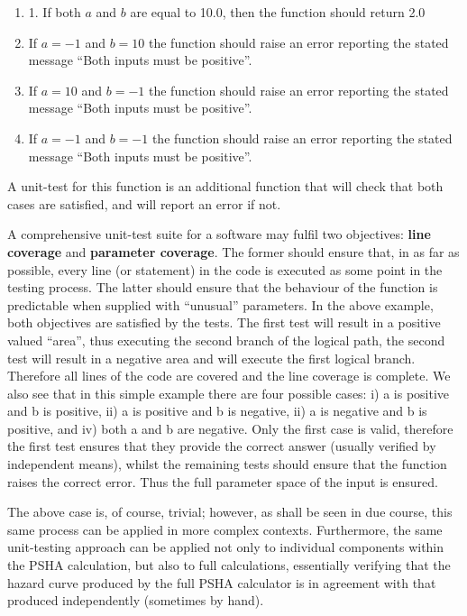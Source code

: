 \begin{enumerate}
\item 1. If both $a$ and $b$ are equal to 10.0, then the function 
    should return 2.0
\item If $a = -1$ and $b = 10$ the function should raise an error 
    reporting the stated message ``Both inputs must be positive''.
\item If $a = 10$ and $b = -1$ the function should raise an error 
    reporting the stated message ``Both inputs must be positive''.
\item If $a = -1$ and $b = -1$ the function should raise an error 
    reporting the stated message ``Both inputs must be positive''.
\end{enumerate}

A unit-test for this function is an additional function that will 
check that both cases are satisfied, and will report an error if not. 

A comprehensive unit-test suite for a software may fulfil two objectives: 
\textbf{line coverage} and \textbf{parameter coverage}. The former should 
ensure that, in as far as possible, every line (or statement) in the code 
is executed as some point in the testing process. The latter should ensure
that the behaviour of the function is predictable when supplied with 
``unusual'' parameters. In the above example, both objectives are satisfied
by the tests. The first test will result in a positive valued ``area'',
thus executing the second branch of the logical path, the second test will
result in a negative area and will execute the first logical branch. 
%
Therefore all lines of the code are covered and the line coverage is 
complete. We also see that in this simple example there are four possible
cases: i) a is positive and b is positive, ii) a is positive and b is 
negative,  ii) a is negative and b is positive, and iv) both a and b 
are negative. Only the first case is valid, therefore the first test 
ensures that they provide the correct answer (usually verified by 
independent means), whilst the remaining tests should ensure that 
the function raises the correct error. Thus the full parameter space 
of the input is ensured.

The above case is, of course, trivial; however, as shall be seen in due
course, this same process can be applied in more complex contexts. 
%
Furthermore, the same unit-testing approach can be applied not only 
to individual components within the PSHA calculation, but also to 
full calculations, essentially verifying that the hazard curve 
produced by the full PSHA calculator is in agreement with that 
produced independently (sometimes by hand).
%
